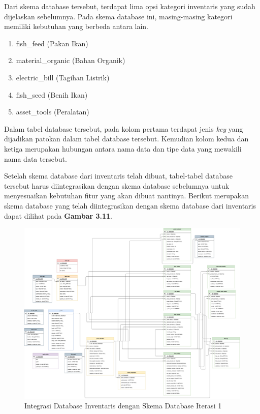 \begin{enumerate}
\begin{enumerate}
		Dari skema database tersebut, terdapat lima opsi kategori inventaris yang sudah dijelaskan sebelumnya. Pada skema database ini, masing-masing kategori memiliki kebutuhan yang berbeda antara lain.
	
		\begin{enumerate}
			\item fish\_feed (Pakan Ikan)
			\item material\_organic (Bahan Organik)
			\item electric\_bill (Tagihan Listrik)
			\item fish\_seed (Benih Ikan)
			\item asset\_tools (Peralatan)
		\end{enumerate}
	
		Dalam tabel database tersebut, pada kolom pertama terdapat jenis \textit{key} yang dijadikan patokan dalam tabel database tersebut. Kemudian kolom kedua dan ketiga merupakan hubungan antara nama data dan tipe data yang mewakili nama data tersebut.
	
		Setelah skema database dari inventaris telah dibuat, tabel-tabel database tersebut harus diintegrasikan dengan skema database sebelumnya untuk menyesuaikan kebutuhan fitur yang akan dibuat nantinya. Berikut merupakan skema database yang telah diintegrasikan dengan skema database dari inventaris dapat dilihat pada \textbf{Gambar 3.11}.
	
		\begin{figure}[H]
			\centering
			\includegraphics[width=1.5\linewidth,height=1.00\linewidth, angle=270]{gambar/sprint1/sprint1_skema_database.png}
			\caption{Integrasi Database Inventaris dengan Skema Database Iterasi 1}
		\end{figure}


\end{enumerate}
\end{enumerate}

